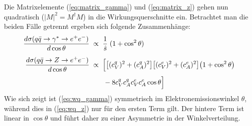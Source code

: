 Die Matrixelemente (\ref{eq:matrix_gamma}) und (\ref{eq:matrix_z}) gehen nun
quadratisch ($|M|^2=M^\dagger M$) in die Wirkungsquerschnitte ein. Betrachtet
man die beiden Fälle getrennt ergeben sich folgende Zusammenhänge:
\begin{align}
    \frac{d\sigma(q\bar q\rightarrow \gamma^* \rightarrow e^+e^-)}{d\cos\theta}
        &\;\propto\; \frac{1}{\hat s}\;(1+\cos^2\theta)
        \label{eq:wq_gamma} \\[5pt]
    \frac{d\sigma(q\bar q\rightarrow Z \rightarrow e^+e^-)}{d\cos\theta}
        &\;\propto\;
            \Bigl[
                \bigl[ (c_V^q)^2 + (c_A^q)^2 \bigr]
                \bigl[ (c_V^e)^2 + (c_A^e)^2 \bigr]
                \bigl( 1 + \cos^2\theta      \bigr)
                \nonumber \\[3pt] & \qquad
                - 8 c_V^q c_A^q c_V^e c_A^e \cos\theta
            \Bigr]
            \label{eq:wq_z}
\end{align}
Wie sich zeigt ist (\ref{eq:wq_gamma}) symmetrisch im Elektronemissionswinkel
$\theta$, während dies in (\ref{eq:wq_z}) nur für den ersten Term gilt. Der
hintere Term ist linear in $\cos\theta$ und führt daher zu einer Asymmetrie in
der Winkelverteilung.

